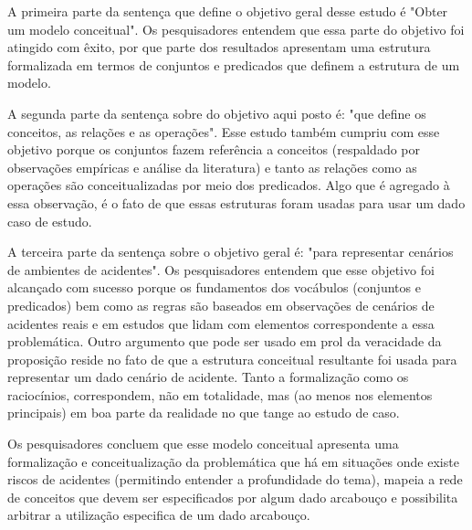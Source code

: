 A primeira parte da sentença que define o objetivo geral desse estudo é "Obter um modelo conceitual". Os pesquisadores entendem que essa parte do objetivo foi atingido com êxito, por que parte dos resultados apresentam uma estrutura formalizada em termos de conjuntos e predicados que definem a estrutura de um modelo. 

A segunda parte da sentença sobre do objetivo aqui posto é: "que define os conceitos, as relações e as operações". Esse estudo também cumpriu com esse objetivo porque os conjuntos fazem referência a conceitos (respaldado por observações empíricas e análise da literatura) e tanto as relações como as operações são conceitualizadas por meio dos predicados. Algo que é agregado à essa observação, é o fato de que essas estruturas foram usadas para usar um dado caso de estudo.

A terceira parte da sentença sobre o objetivo geral é: "para representar cenários de ambientes de acidentes". Os pesquisadores entendem que esse objetivo foi alcançado com sucesso porque os fundamentos dos vocábulos (conjuntos e predicados) bem como as regras são baseados em observações de cenários de acidentes reais e  em estudos que lidam com elementos correspondente a essa problemática. Outro argumento que pode ser usado em prol da veracidade da proposição reside no fato de que a estrutura conceitual resultante foi usada para representar um dado cenário de acidente. Tanto a formalização como os raciocínios, correspondem, não em totalidade, mas (ao menos nos elementos principais) em boa parte da realidade no que tange ao estudo de caso. 

Os pesquisadores concluem que esse modelo conceitual apresenta uma formalização e conceitualização da problemática que há em situações onde existe riscos de acidentes (permitindo entender a profundidade do tema), mapeia a rede de conceitos que devem ser especificados por algum dado arcabouço e possibilita arbitrar a utilização especifica de um dado arcabouço.